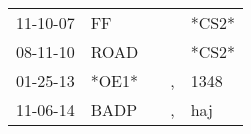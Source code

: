 \begin{supertabular}{p{0.07\textwidth}p{0.06\textwidth}p{0.02\textwidth}p{0.02\textwidth}p{0.06\textwidth}}
 11-10-07\textsuperscript{} &             FF\textsuperscript{} &               &               &                            *CS2* \\
 08-11-10\textsuperscript{} &           ROAD\textsuperscript{} &               &               &                            *CS2* \\
 01-25-13\textsuperscript{} &                            *OE1* &               &             , &           1348\textsuperscript{} \\
 11-06-14\textsuperscript{} &           BADP\textsuperscript{} &               &             , &            haj\textsuperscript{} \\
\end{supertabular}
